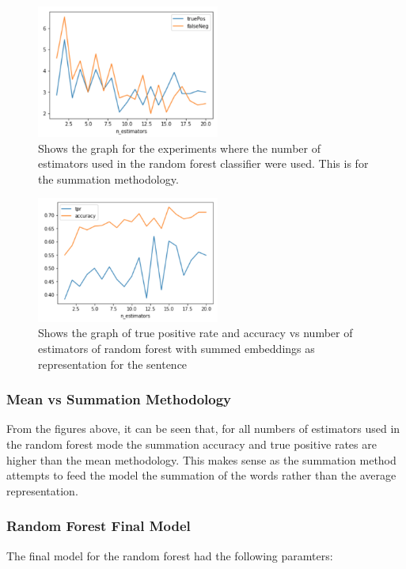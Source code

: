 \documentclass[twoside,twocolumn]{article}
\begin{document}
\begin{figure}[H]
\includegraphics[width=6cm]{randForest_estimators_meaned_graph}
\centering
\caption{Shows the graph for the experiments where the number of estimators used
in the random forest classifier were used. This is for the summation methodology.}
\end{figure}

\begin{figure}[H]
\includegraphics[width=6cm]{randForest_estimators_meaned_graph-tpr}
\centering
\caption{Shows the graph of true positive rate and accuracy vs number of estimators of random forest 
with summed embeddings as representation for the sentence}
\end{figure}


\subsubsection{Mean vs Summation Methodology}

From the figures above, it can be seen that, for all numbers of estimators used in the
random forest mode the summation accuracy and true positive rates are higher than the mean
methodology. This makes sense as the summation method attempts to feed the model the summation
of the words rather than the average representation.

\subsubsection{Random Forest Final Model}

The final model for the random forest had the following paramters:
\end{document}
